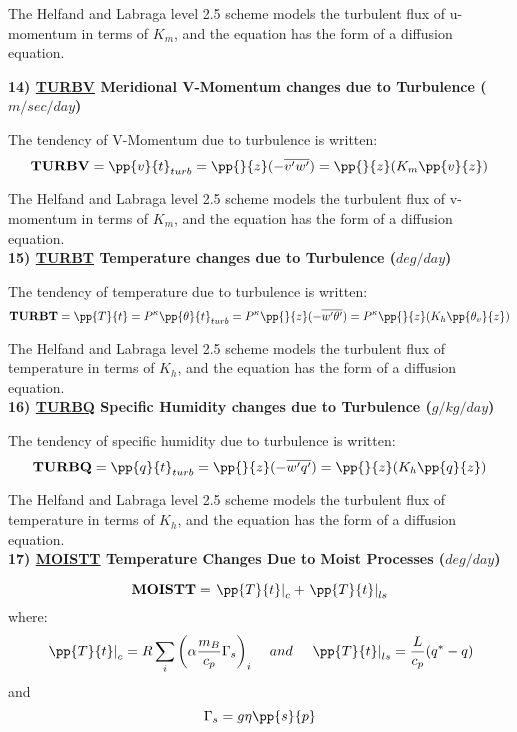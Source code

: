 \noindent
The Helfand and Labraga level 2.5 scheme models the turbulent
flux of u-momentum in terms of $K_m$, and the equation has the form of a diffusion
equation.
 
\noindent
{\bf 14)  \underline {TURBV}  Meridional V-Momentum changes due to Turbulence ($m/sec/day$) }
 
\noindent
The tendency of V-Momentum due to turbulence is written:
\[
{\bf TURBV} = {\pp{v}{t}}_{turb} = {\pp{}{z} }{(- \overline{v^{\prime}w^{\prime}})}
 = {\pp{}{z} }{(K_m \pp{v}{z})}
\]

\noindent
The Helfand and Labraga level 2.5 scheme models the turbulent
flux of v-momentum in terms of $K_m$, and the equation has the form of a diffusion
equation.
\\
 
\noindent
{\bf 15)  \underline {TURBT}  Temperature changes due to Turbulence ($deg/day$) }
 
\noindent
The tendency of temperature due to turbulence is written:
\[
{\bf TURBT} = {\pp{T}{t}} = P^{\kappa}{\pp{\theta}{t}}_{turb} = 
P^{\kappa}{\pp{}{z} }{(- \overline{w^{\prime}\theta^{\prime}})}
 = P^{\kappa}{\pp{}{z} }{(K_h \pp{\theta_v}{z})}
\]

\noindent
The Helfand and Labraga level 2.5 scheme models the turbulent
flux of temperature in terms of $K_h$, and the equation has the form of a diffusion
equation.
\\
 
\noindent
{\bf 16)  \underline {TURBQ}  Specific Humidity changes due to Turbulence ($g/kg/day$) }
 
\noindent
The tendency of specific humidity due to turbulence is written:
\[
{\bf TURBQ} = {\pp{q}{t}}_{turb} = {\pp{}{z} }{(- \overline{w^{\prime}q^{\prime}})}
 = {\pp{}{z} }{(K_h \pp{q}{z})}
\]

\noindent
The Helfand and Labraga level 2.5 scheme models the turbulent
flux of temperature in terms of $K_h$, and the equation has the form of a diffusion
equation.
\\
 
\noindent
{\bf 17)  \underline {MOISTT} Temperature Changes Due to Moist Processes ($deg/day$) } 

\noindent
\[
{\bf MOISTT} = \left. {\pp{T}{t}}\right|_{c} + \left. {\pp{T}{t}} \right|_{ls}
\]
where:
\[
\left.{\pp{T}{t}}\right|_{c} = R \sum_i \left( \alpha { m_B \over c_p} \Gamma_s \right)_i 
\hspace{.4cm} and 
\hspace{.4cm} \left.{\pp{T}{t}}\right|_{ls} = {L \over c_p } (q^*-q)
\]
and
\[
\Gamma_s = g \eta \pp{s}{p}
\]

